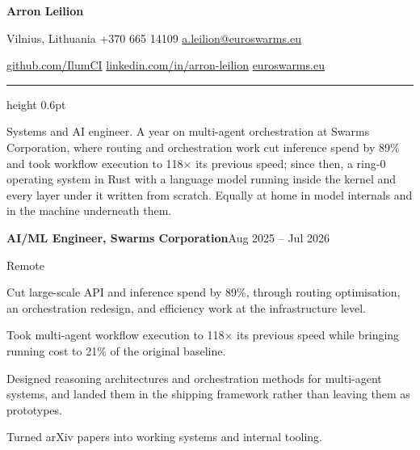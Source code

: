 \documentclass[10pt,a4paper]{article}
\newcommand{\sect}[1]{%
  \vspace{9pt}{\normalsize\bfseries #1}\par
  \vspace{2pt}{\color{rule}\hrule height 0.5pt}\vspace{5pt}}
\newenvironment{bullets}%
  {\begin{list}{\textbullet}{%
     \setlength{\leftmargin}{11pt}\setlength{\labelwidth}{7pt}%
     \setlength{\labelsep}{4pt}\setlength{\itemsep}{1.2pt}%
     \setlength{\parsep}{0pt}\setlength{\topsep}{2pt}%
     \setlength{\partopsep}{0pt}}}%
  {\end{list}}
\newcommand{\headline}[2]{%
  \textbf{#1}\hfill{\color{muted}#2}\par}
\newcommand{\entry}[4]{%
  \headline{#1, #2}{#4}%
  {\color{muted}#3}\par\vspace{2pt}}
\begin{document}
{\LARGE\bfseries Arron Leilion}\par\vspace{3pt}
{\small
Vilnius, Lithuania \quad\textbullet\quad +370 665 14109 \quad\textbullet\quad
\href{mailto:a.leilion@euroswarms.eu}{a.leilion@euroswarms.eu}\par\vspace{1pt}
\href{https://github.com/IlumCI}{github.com/IlumCI} \quad\textbullet\quad
\href{https://www.linkedin.com/in/arron-leilion-37a699350/}{linkedin.com/in/arron-leilion} \quad\textbullet\quad
\href{https://euroswarms.eu/}{euroswarms.eu}\par}
\vspace{4pt}
{\color{rule}\hrule height 0.6pt}
\vspace{2pt}

Systems and AI engineer. A year on multi-agent orchestration at Swarms
Corporation, where routing and orchestration work cut inference spend by 89\%
and took workflow execution to 118$\times$ its previous speed; since then, a
ring-0 operating system in Rust with a language model running inside the kernel
and every layer under it written from scratch. Equally at home in model
internals and in the machine underneath them.

\sect{Experience}

\entry{AI/ML Engineer}{Swarms Corporation}{Remote}{Aug 2025 -- Jul 2026}
\begin{bullets}
  \item Cut large-scale API and inference spend by 89\%, through routing
        optimisation, an orchestration redesign, and efficiency work at the
        infrastructure level.
  \item Took multi-agent workflow execution to 118$\times$ its previous speed
        while bringing running cost to 21\% of the original baseline.
  \item Designed reasoning architectures and orchestration methods for
        multi-agent systems, and landed them in the shipping framework rather
        than leaving them as prototypes.
  \item Turned arXiv papers into working systems and internal tooling.
\end{bullets}
\vspace{4pt}
\end{document}

